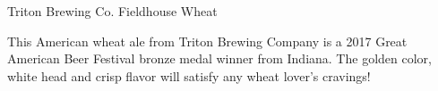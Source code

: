 \begin{recipie}{Triton Brewing Co. Fieldhouse Wheat}

\begin{aboutblock}
This American wheat ale from Triton Brewing Company is a 2017 Great American
Beer Festival bronze medal winner from Indiana. The golden color, white head
and crisp flavor will satisfy any wheat lover's cravings!
\end{aboutblock}


\begin{methodandtiming}
 
\begin{mashsteps}
\end{mashsteps}

\begin{fermentationsteps}
\end{fermentationsteps}

\end{methodandtiming}

\pagebreak

\begin{ingredientsblock}

\begin{malts}
\end{malts}

\begin{hops}
\end{hops}

\begin{yeasts}
\end{yeasts}

\end{ingredientsblock}

\end{recipie}

